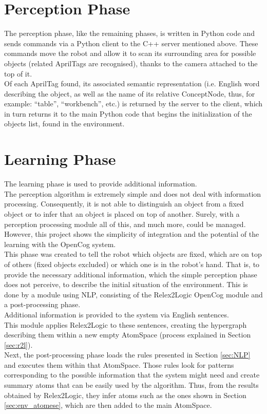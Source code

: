 \section{Perception Phase}\label{sec:perception}

The perception phase, like the remaining phases, is written in Python code and sends commands via a Python client to the C++ server mentioned above. These commands move the robot and allow it to scan its surrounding area for possible objects (related AprilTags are recognised), thanks to the camera attached to the top of it. \\
Of each AprilTag found, its associated semantic representation (i.e. English word describing the object, as well as the name of its relative ConceptNode, thus, for example: \enquote{table}, \enquote{workbench}, etc.) is returned by the server to the client, which in turn returns it to the main Python code that begins the initialization of the objects list, found in the environment.

\section{Learning Phase}\label{sec:learning}

The learning phase is used to provide additional information. \\
The perception algorithm is extremely simple and does not deal with information processing. Consequently, it is not able to distinguish an object from a fixed object or to infer that an object is placed on top of another. Surely, with a perception processing module all of this, and much more, could be managed. \\
However, this project shows the simplicity of integration and the potential of the learning with the OpenCog system. \\

This phase was created to tell the robot which objects are fixed, which are on top of others (fixed objects excluded) or which one is in the robot's hand. That is, to provide the necessary additional information, which the simple perception phase does not perceive, to describe the initial situation of the environment.
This is done by a module using NLP, consisting of the Relex2Logic OpenCog module and a post-processing phase. \\

Additional information is provided to the system via English sentences. \\
This module applies Relex2Logic to these sentences, creating the hypergraph describing them within a new empty AtomSpace (process explained in Section \ref{sec:r2l}).  \\
Next, the post-processing phase loads the rules presented in Section \ref{sec:NLP} and executes them within that AtomSpace. Those rules look for patterns corresponding to the possible information that the system might need and create summary atoms that can be easily used by the algorithm. Thus, from the results obtained by Relex2Logic, they infer atoms such as the ones shown in Section \ref{sec:env_atomese}, which are then added to the main AtomSpace. \\

